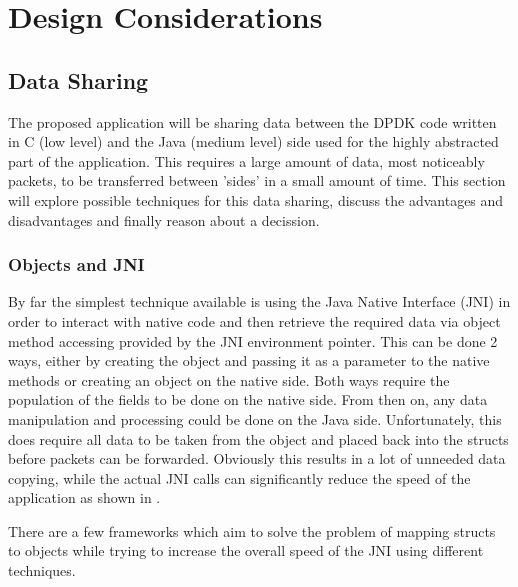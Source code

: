 \documentclass[final_report.tex]{subfiles}
\begin{document}
\section{Design Considerations}

\subsection{Data Sharing}
The proposed application will be sharing data between the DPDK code written in C (low level) and the Java (medium level) side used for the highly abstracted part of the application. This requires a large amount of data, most noticeably packets, to be transferred between 'sides' in a small amount of time. This section will explore possible techniques for this data sharing, discuss the advantages and disadvantages and finally reason about a decission.

\subsubsection{Objects and JNI}
By far the simplest technique available is using the Java Native Interface (JNI) in order to interact with native code and then retrieve the required data via object method accessing provided by the JNI environment pointer. This can be done 2 ways, either by creating the object and passing it as a parameter to the native methods or creating an object on the native side. Both ways require the population of the fields to be done on the native side. From then on, any data manipulation and processing could be done on the Java side. Unfortunately, this does require all data to be taken from the object and placed back into the structs before packets can be forwarded. Obviously this results in a lot of unneeded data copying, while the actual JNI calls can significantly reduce the speed of the application as shown in .

There are a few frameworks which aim to solve the problem of mapping structs to objects while trying to increase the overall speed of the JNI using different techniques.
\end{document}
